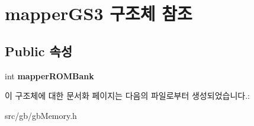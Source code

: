 \hypertarget{structmapper_g_s3}{}\section{mapper\+G\+S3 구조체 참조}
\label{structmapper_g_s3}
\subsection*{Public 속성}
\begin{DoxyCompactItemize}
\item 
\mbox{\label{structmapper_g_s3_a375ce461bdac1b363b026c832000513e}} 
int {\bfseries mapper\+R\+O\+M\+Bank}
\end{DoxyCompactItemize}


이 구조체에 대한 문서화 페이지는 다음의 파일로부터 생성되었습니다.\+:\begin{DoxyCompactItemize}
\item 
src/gb/gb\+Memory.\+h\end{DoxyCompactItemize}
